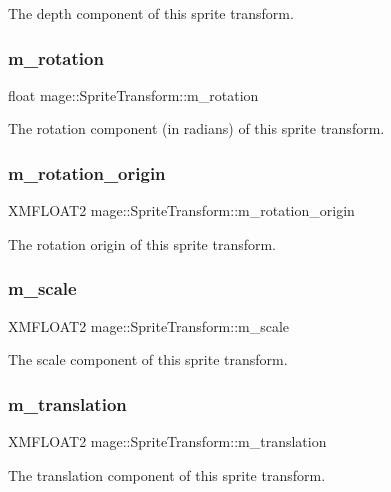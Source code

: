 The depth component of this sprite transform. \hypertarget{structmage_1_1_sprite_transform_a6fcb43d224953ea5f38ef54c4e10e003}{}\label{structmage_1_1_sprite_transform_a6fcb43d224953ea5f38ef54c4e10e003} 
\subsubsection{\texorpdfstring{m\+\_\+rotation}{m\_rotation}}
{\footnotesize\ttfamily float mage\+::\+Sprite\+Transform\+::m\+\_\+rotation\hspace{0.3cm}{\ttfamily [private]}}

The rotation component (in radians) of this sprite transform. \hypertarget{structmage_1_1_sprite_transform_ae51ebd0226ef4b569b6a66884823bd18}{}\label{structmage_1_1_sprite_transform_ae51ebd0226ef4b569b6a66884823bd18} 
\subsubsection{\texorpdfstring{m\+\_\+rotation\+\_\+origin}{m\_rotation\_origin}}
{\footnotesize\ttfamily X\+M\+F\+L\+O\+A\+T2 mage\+::\+Sprite\+Transform\+::m\+\_\+rotation\+\_\+origin\hspace{0.3cm}{\ttfamily [private]}}

The rotation origin of this sprite transform. \hypertarget{structmage_1_1_sprite_transform_a7532d4d41d02b5fa6f31eeb4fd4fd886}{}\label{structmage_1_1_sprite_transform_a7532d4d41d02b5fa6f31eeb4fd4fd886} 
\subsubsection{\texorpdfstring{m\+\_\+scale}{m\_scale}}
{\footnotesize\ttfamily X\+M\+F\+L\+O\+A\+T2 mage\+::\+Sprite\+Transform\+::m\+\_\+scale\hspace{0.3cm}{\ttfamily [private]}}

The scale component of this sprite transform. \hypertarget{structmage_1_1_sprite_transform_a7642907ec8ae9685bb7c56675607045b}{}\label{structmage_1_1_sprite_transform_a7642907ec8ae9685bb7c56675607045b} 
\subsubsection{\texorpdfstring{m\+\_\+translation}{m\_translation}}
{\footnotesize\ttfamily X\+M\+F\+L\+O\+A\+T2 mage\+::\+Sprite\+Transform\+::m\+\_\+translation\hspace{0.3cm}{\ttfamily [private]}}

The translation component of this sprite transform. 